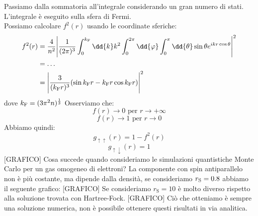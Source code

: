 Passiamo dalla sommatoria all'integrale considerando un gran numero di stati. L'integrale è eseguito sulla sfera di Fermi.\\
Possiamo calcolare $f^2(r)$ usando le coordinate sferiche:
\begin{equation*}
    \begin{aligned}
        f^2(r) & = \frac{4}{n^2}\Bigg|\frac{1}{(2\pi)^3}\int_0^{k_\text{F}}\dd{k}k^2\int_0^{2\pi}\dd{\varphi}\int_0^\pi\dd{\theta}\sin\theta e^{ikr\cos\theta}\Bigg|^2 \\
        & = \dots \\
        & = \Bigg|\frac{3}{(k_\text{F}r)^3}(\sin k_{\text{F}}r-k_{\text F}r\cos k_{\text F}r)\Bigg|^2
    \end{aligned}
\end{equation*}
dove $k_{\text F}=(3\pi^2n)^{\frac13}$
Osserviamo che:
\begin{equation*}
    f(r) \rightarrow 0 \text{ per } r \rightarrow +\infty
\end{equation*}
\begin{equation*}
    f(r) \rightarrow 1 \text{ per } r \rightarrow 0
\end{equation*}
Abbiamo quindi:
\begin{equation*}
    g_{\uparrow\uparrow}(r)=1-f^2(r)
\end{equation*}
\begin{equation*}
    g_{\uparrow\downarrow}(r)=1
\end{equation*}
[GRAFICO]
Cosa succede quando consideriamo le simulazioni quantistiche Monte Carlo per un gas omogeneo di elettroni? La componente con spin antiparallelo non è più costante, ma dipende dalla densità, se consideriamo $r_{\text S}=0.8$ abbiamo il seguente grafico:
[GRAFICO]
Se consideriamo $r_\text{S}=10$ è molto diverso rispetto alla soluzione trovata con Hartree-Fock.
[GRAFICO]
Ciò che otteniamo è sempre una soluzione numerica, non è possibile ottenere questi risultati in via analitica.

